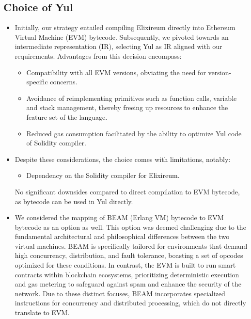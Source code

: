 \subsection{Choice of Yul}
\begin{itemize}
    \item Initially, our strategy entailed compiling Elixireum directly into Ethereum Virtual Machine (EVM) bytecode. Subsequently, we pivoted towards an intermediate representation (IR), selecting Yul as IR aligned with our requirements. Advantages from this decision encompass:
        \begin{itemize}
            \item Compatibility with all EVM versions, obviating the need for version-specific concerns.
            \item Avoidance of reimplementing primitives such as function calls, variable and stack management, thereby freeing up resources to enhance the feature set of the language.
            \item Reduced gas consumption facilitated by the ability to optimize Yul code of Solidity compiler.
        \end{itemize}
    \item Despite these considerations, the choice comes with limitations, notably:
        \begin{itemize}
            \item Dependency on the Solidity compiler for Elixireum.
        \end{itemize}

        No significant downsides compared to direct compilation to EVM bytecode, as bytecode can be used in Yul directly.
    \item We considered the mapping of BEAM (Erlang VM) bytecode to EVM bytecode as an option as well. This option was deemed challenging due to the fundamental architectural and philosophical differences between the two virtual machines. BEAM is specifically tailored for environments that demand high concurrency, distribution, and fault tolerance, boasting a set of opcodes optimized for these conditions. In contrast, the EVM is built to run smart contracts within blockchain ecosystems, prioritizing deterministic execution and gas metering to safeguard against spam and enhance the security of the network. Due to these distinct focuses, BEAM incorporates specialized instructions for concurrency and distributed processing, which do not directly translate to EVM.
\end{itemize}


